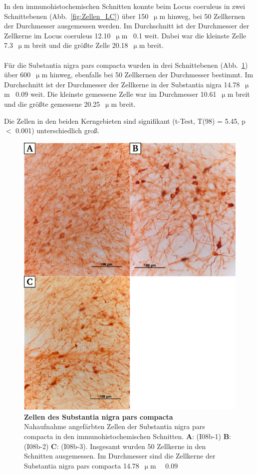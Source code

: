 \documentclass[12pt,a4paper,pdftex]{article}
\newcommand{\rpm}{\raisebox{.2ex}{$\scriptstyle\pm$} }
\begin{document}
In den immunohistochemischen Schnitten konnte beim Locus coeruleus  in zwei Schnittebenen (Abb.~\ref{fig:Zellen_LC}) über 150~$\upmu$m hinweg, bei 50 Zellkernen der Durchmesser ausgemessen werden. Im Durchschnitt ist der Durchmesser der Zellkerne im Locus coeruleus 12.10~$\upmu$m~\rpm0.1 weit. Dabei war die kleinste Zelle 7.3~$\upmu$m breit und die größte Zelle 20.18~$\upmu$m breit.
\\
\\
Für die Substantia nigra pars compacta  wurden in drei Schnittebenen (Abb.~\ref{fig:Zellen_SNC}) über 600~$\upmu$m hinweg, ebenfalls bei 50 Zellkernen der Durchmesser bestimmt. Im Durchschnitt ist der Durchmesser der Zellkerne in der Substantia nigra 14.78~$\upmu$m~\rpm0.09 weit. Die kleinste gemessene Zelle war im Durchmesser 10.61~$\upmu$m breit und die größte gemessene 20.25~$\upmu$m breit.

Die Zellen in den beiden Kerngebieten sind signifikant (t-Test, T(98) = 5.45, p $<$ 0.001) unterschiedlich groß.

\begin{figure}[H]
    \centering
    \includegraphics{pictures/immu/Zellen_SNC.png}
    \caption[Zellen des Substantia nigra pars compacta]{\textbf{Zellen des Substantia nigra pars compacta}\\
    Nahaufnahme angefärbten Zellen der Substantia nigra pars compacta in den immunohistochemischen Schnitten. \textbf{A}: (I08b-1) \textbf{B}: (I08b-2) \textbf{C}: (I08b-3). Insgesamt wurden 50 Zellkerne in den Schnitten ausgemessen. Im Durchmesser sind die Zellkerne der Substantia nigra pars compacta 14.78~$\upmu$m~\rpm~0.09}
    \label{fig:Zellen_SNC}
\end{figure}
\end{document}
